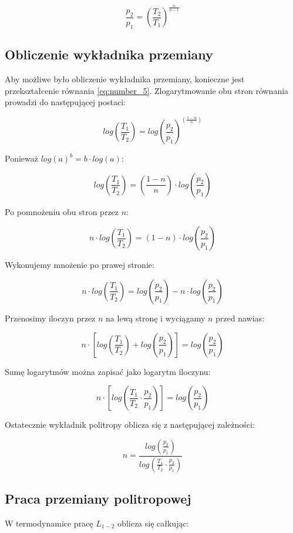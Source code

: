 \begin{equation}
\frac{p_2}{p_1} =   \left( \frac {T_2}{T_1}\right) ^{\frac {n}{n-1}}
\label{eq:number_6}
\end{equation}


\subsection{Obliczenie wykładnika przemiany }
Aby możliwe było obliczenie wykładnika przemiany, konieczne jest przekształcenie równania \eqref{eq:number_5}. Zlogarytmowanie obu stron równania prowadzi do następującej postaci:

\[log \left( \frac{T_1}{T_2} \right) = log \left( \frac{p_2}{p_1} \right)^ {\left( \frac{1-n}{n} \right)} \]

Ponieważ $log(a)^b = b\cdot log(a)$:

\[log \left( \frac{T_1}{T_2} \right) = \left( \frac{1-n}{n} \right) \cdot log \left( \frac{p_2}{p_1} \right)\]

Po pomnożeniu obu stron przez $n$:

\[n \cdot log \left( \frac{T_1}{T_2} \right) = \left( {1-n} \right) \cdot log \left( \frac{p_2}{p_1} \right)\]

Wykonujemy mnożenie po prawej stronie:

\[n \cdot log \left( \frac{T_1}{T_2} \right) = log \left( \frac{p_2}{p_1} \right) - n \cdot log \left( \frac{p_2}{p_1} \right)\]

Przenosimy iloczyn przez $n$ na lewą stronę i wyciągamy $n$ przed nawias:

\[n \cdot \left[ log \left( \frac{T_1}{T_2} \right) + log \left( \frac{p_2}{p_1} \right) \right] = log \left( \frac{p_2}{p_1} \right)\]

Sumę logarytmów można zapisać jako logarytm iloczynu:

\[n \cdot \left[ log \left( \frac{T_1}{T_2} \cdot \frac{p_2}{p_1} \right) \right] = log \left( \frac{p_2}{p_1} \right)\]

Ostatecznie wykładnik politropy oblicza się z następującej zależności:

\[n = \frac {log \left( \frac{p_2}{p_1} \right)} {log \left( \frac{T_1}{T_2} \cdot \frac{p_2}{p_1} \right)}  \]



\subsection{Praca przemiany politropowej}
W termodynamice pracę $L_{1-2}$ oblicza się całkując:

